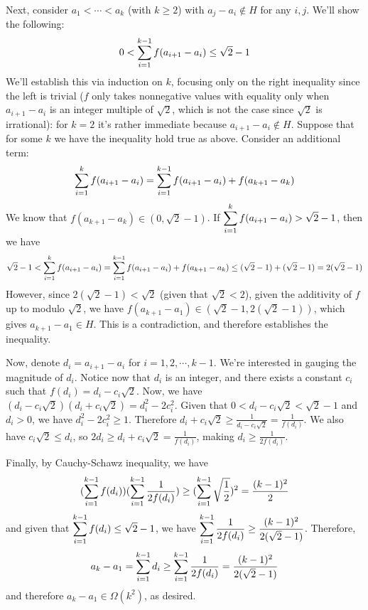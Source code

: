 \documentclass[11pt,a4paper]{article}
\begin{document}
\begin{enumerate}
	Next, consider $a_1<\cdots < a_k$ (with $k\ge 2$) with $a_j-a_i\not\in H$ for any $i, j$. We'll show the following: 
	\[
	0 < \displaystyle\sum_{i=1}^{k-1} f(a_{i+1}-a_i) \le \sqrt{2} - 1
	\]
	We'll establish this via induction on $k$, focusing only on the right inequality since the left is trivial ($f$ only takes nonnegative values with equality only when $a_{i+1}-a_i$ is an integer multiple of $\sqrt{2}$, which is not the case since $\sqrt{2}$ is irrational): for $k=2$ it's rather immediate because $a_{i+1}-a_i\not\in H$. Suppose that for some $k$ we have the inequality hold true as above. Consider an additional term: 
	\[
	\displaystyle\sum_{i=1}^{k} f(a_{i+1}-a_i)=\displaystyle\sum_{i=1}^{k-1} f(a_{i+1}-a_i) + f(a_{k+1}-a_k)
	\]
	We know that $f(a_{k+1}-a_k)\in (0, \sqrt{2}-1)$. If $\displaystyle\sum_{i=1}^{k} f(a_{i+1}-a_i)> \sqrt{2}-1$, then we have 
	\[
	\sqrt{2}-1 < \displaystyle\sum_{i=1}^{k} f(a_{i+1}-a_i) = \displaystyle\sum_{i=1}^{k-1} f(a_{i+1}-a_i) + f(a_{k+1}-a_k) \le (\sqrt{2}-1)+(\sqrt{2}-1) = 2(\sqrt{2}-1)
	\]
	However, since $2(\sqrt{2}-1) < \sqrt{2}$ (given that $\sqrt{2}<2$), given the additivity of $f$ up to modulo $\sqrt{2}$, we have $f(a_{k+1}-a_1)\in (\sqrt{2}-1, 2(\sqrt{2}-1))$, which gives $a_{k+1}-a_1\in H$. This is a contradiction, and therefore establishes the inequality. 
	
	Now, denote $d_i=a_{i+1}-a_i$ for $i=1, 2, \cdots , k-1$. We're interested in gauging the magnitude of $d_i$.  Notice now that $d_i$ is an integer, and there exists a constant $c_i$ such that $f(d_i)=d_i-c_i\sqrt{2}$. Now, we have $(d_i-c_i\sqrt{2})(d_i+c_i\sqrt{2})=d_i^2-2c_i^2$. Given that $0<d_i-c_i\sqrt{2}<\sqrt{2}-1$ and $d_i>0$, we have $d_i^2-2c_i^2\ge 1$. Therefore $d_i+c_i\sqrt{2}\ge \frac{1}{d_i-c_i\sqrt{2}}=\frac{1}{f(d_i)}$. We also have $c_i\sqrt{2}\le d_i$, so $2d_i\ge d_i+c_i\sqrt{2}=\frac{1}{f(d_i)}$, making $d_i\ge \frac{1}{2f(d_i)}$. 
	
	Finally, by Cauchy-Schawz inequality, we have 
	\[
	(\displaystyle\sum_{i=1}^{k-1} f(d_i))(\displaystyle\sum_{i=1}^{k-1} \frac{1}{2f(d_i)})\ge (\displaystyle\sum_{i=1}^{k-1}\sqrt{\frac{1}{2}})^2 = \frac{(k-1)^2}{2}
	\]
	and given that $\displaystyle\sum_{i=1}^{k-1} f(d_i)\le \sqrt{2}-1$, we have $\displaystyle\sum_{i=1}^{k-1} \frac{1}{2f(d_i)}\ge \frac{(k-1)^2}{2(\sqrt{2}-1)}$. Therefore, 
	\[
	a_k-a_1 =\displaystyle\sum_{i=1}^{k-1} d_i \ge \displaystyle\sum_{i=1}^{k-1} \frac{1}{2f(d_i)} = \frac{(k-1)^2}{2(\sqrt{2}-1)}
	\]
	and therefore $a_k-a_1\in \Omega(k^2)$, as desired. 
\end{enumerate}
\end{document}
